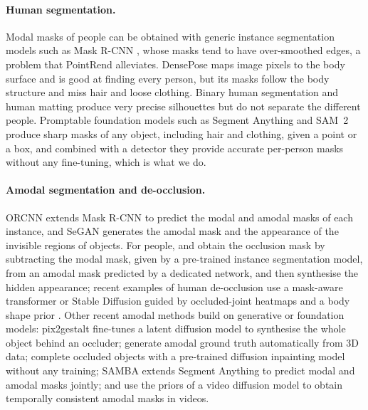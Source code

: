 \documentclass[11pt,a4paper]{article}
\begin{document}
\paragraph{Human segmentation.} Modal masks of people can be obtained with generic instance segmentation models such as Mask R-CNN \citep{MaskRCNN}, whose masks tend to have over-smoothed edges, a problem that PointRend \citep{kirillov2019pointrend} alleviates. DensePose \citep{Guler2018DensePose} maps image pixels to the body surface and is good at finding every person, but its masks follow the body structure and miss hair and loose clothing. Binary human segmentation \citep{people_segmentation} and human matting \citep{wu2020skip} produce very precise silhouettes but do not separate the different people. Promptable foundation models such as Segment Anything \citep{kirillov2023sam} and SAM~2 \citep{ravi2024sam2} produce sharp masks of any object, including hair and clothing, given a point or a box, and combined with a detector they provide accurate per-person masks without any fine-tuning, which is what we do.

\paragraph{Amodal segmentation and de-occlusion.} ORCNN \citep{orcnn} extends Mask R-CNN to predict the modal and amodal masks of each instance, and SeGAN \citep{SeGAN} generates the amodal mask and the appearance of the invisible regions of objects. For people, \citet{sym14030531} and \citet{AHPdataset} obtain the occlusion mask by subtracting the modal mask, given by a pre-trained instance segmentation model, from an amodal mask predicted by a dedicated network, and then synthesise the hidden appearance; recent examples of human de-occlusion use a mask-aware transformer \citep{liang2024dmat} or Stable Diffusion guided by occluded-joint heatmaps and a body shape prior \citep{noh2025sddeocclusion}. Other recent amodal methods build on generative or foundation models: pix2gestalt \citep{ozguroglu2024pix2gestalt} fine-tunes a latent diffusion model to synthesise the whole object behind an occluder; \citet{zhan2024amodal} generate amodal ground truth automatically from 3D data; \citet{xu2024amodal} complete occluded objects with a pre-trained diffusion inpainting model without any training; SAMBA \citep{liu2025samba} extends Segment Anything to predict modal and amodal masks jointly; and \citet{chen2025diffvas} use the priors of a video diffusion model to obtain temporally consistent amodal masks in videos.
\end{document}
